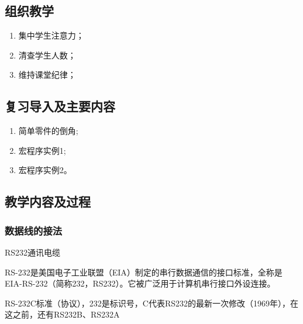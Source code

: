 \jxhj{%
	}

\makeshouye %

\subsection{组织教学}
\begin{enumerate}[\hspace{2em}1、]
	\item 集中学生注意力；
	\item 清查学生人数；
	\item 维持课堂纪律；
\end{enumerate}
\subsection{复习导入及主要内容}
\begin{enumerate}[1、]
	\item 简单零件的倒角;
	\item 宏程序实例1;
	\item 宏程序实例2。
\end{enumerate}


\subsection{教学内容及过程}


\subsubsection{数据线的接法}
RS232通讯电缆

RS-232是美国电子工业联盟（EIA）制定的串行数据通信的接口标准，全称是EIA-RS-232（简称232，RS232）。它被广泛用于计算机串行接口外设连接。

RS-232C标准（协议），232是标识号，C代表RS232的最新一次修改（1969年），在这之前，还有RS232B、RS232A

